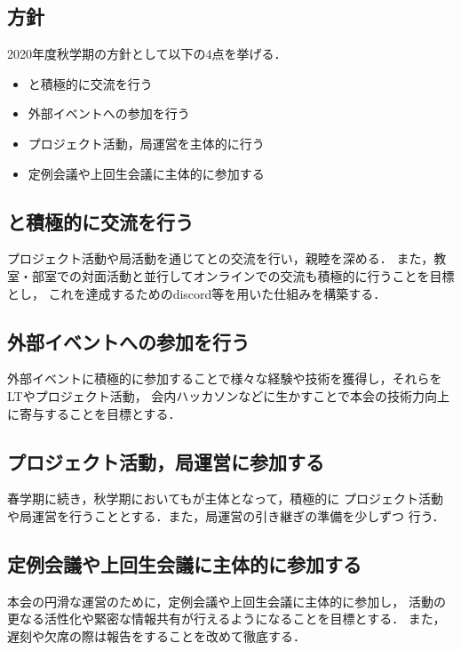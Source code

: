 \subsection*{\newGradeIfKouki{}\secondGrade{}方針}


2020年度秋学期の\secondGrade{}方針として以下の4点を挙げる．

\begin{itemize}
    \item \firstGrade{}と積極的に交流を行う
    \item 外部イベントへの参加を行う
    \item プロジェクト活動，局運営を主体的に行う
    \item 定例会議や上回生会議に主体的に参加する
\end{itemize}

\subsection*{\firstGrade{}と積極的に交流を行う}
プロジェクト活動や局活動を通じて\firstGrade{}との交流を行い，親睦を深める．
また，教室・部室での対面活動と並行してオンラインでの交流も積極的に行うことを目標とし，
これを達成するためのdiscord等を用いた仕組みを構築する．

\subsection*{外部イベントへの参加を行う}
外部イベントに積極的に参加することで様々な経験や技術を獲得し，それらをLTやプロジェクト活動，
会内ハッカソンなどに生かすことで本会の技術力向上に寄与することを目標とする．

\subsection*{プロジェクト活動，局運営に参加する}
春学期に続き，秋学期においても\secondGrade{}が主体となって，積極的に
プロジェクト活動や局運営を行うこととする．また，局運営の引き継ぎの準備を少しずつ
行う．

\subsection*{定例会議や上回生会議に主体的に参加する}
本会の円滑な運営のために，定例会議や上回生会議に主体的に参加し，
活動の更なる活性化や緊密な情報共有が行えるようになることを目標とする．
また，遅刻や欠席の際は報告をすることを改めて徹底する．
